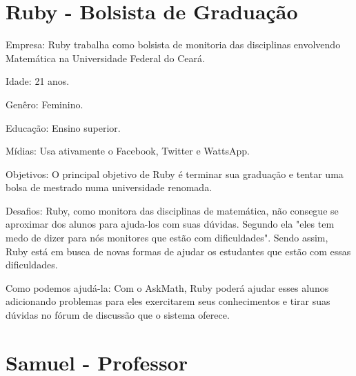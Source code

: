 \section{Ruby - Bolsista de Graduação}

\begin{figure}[h!]
  \centering
\end{figure}


Empresa: Ruby trabalha como bolsista de monitoria das disciplinas envolvendo 
Matemática na Universidade Federal do Ceará.

Idade: 21 anos.

Genêro: Feminino.

Educação: Ensino superior.

Mídias: Usa ativamente o Facebook, Twitter e WattsApp.

Objetivos: O principal objetivo de Ruby é terminar sua graduação e tentar uma 
bolsa de mestrado numa universidade renomada.

Desafios: Ruby, como monitora das disciplinas de matemática, não consegue se
aproximar dos alunos para ajuda-los com suas dúvidas. Segundo ela "eles tem medo de 
dizer para nós monitores que est\~ao com dificuldades". Sendo assim, Ruby está em busca de 
novas formas de ajudar os estudantes que estão com essas dificuldades.

Como podemos ajudá-la: Com o AskMath, Ruby poderá ajudar esses alunos adicionando problemas para eles exercitarem seus conhecimentos e tirar suas d\'uvidas no f\'orum de discuss\~ao que 
o sistema oferece.

\section{Samuel - Professor}

\begin{figure}[h!]
  \centering
\end{figure}

